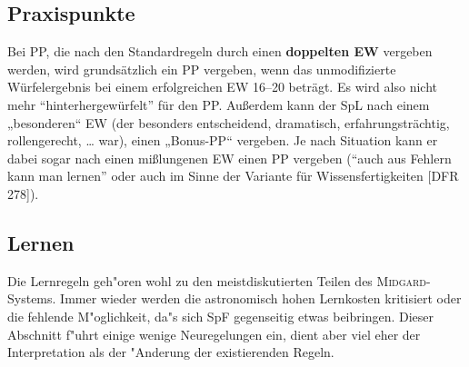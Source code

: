 \documentclass[10pt,a4paper,germanpar]{article}
\begin{document}
\subsection{Praxispunkte}

Bei PP, die nach den Standardregeln durch einen \textbf{doppelten EW}
vergeben werden, wird grundsätzlich ein PP vergeben, wenn das
unmodifizierte Würfelergebnis bei einem erfolgreichen EW 16--20
beträgt. Es wird also nicht mehr "`hinterhergewürfelt"' für den
PP. Außerdem kann der SpL nach einem „besonderen“ EW (der besonders
entscheidend, dramatisch, erfahrungsträchtig, rollengerecht, \dots
war), einen „Bonus-PP“ vergeben. Je nach Situation kann er dabei sogar
nach einen mißlungenen EW einen PP vergeben ("`auch aus Fehlern kann
man lernen"' oder auch im Sinne der Variante für Wissensfertigkeiten
[DFR\,278]).

% 

\subsection{Lernen}

Die Lernregeln geh"oren wohl zu den meistdiskutierten Teilen des
\textsc{Midgard}-Systems. Immer wieder werden die astronomisch hohen
Lernkosten kritisiert oder die fehlende M"oglichkeit, da"s sich SpF
gegenseitig etwas beibringen. Dieser Abschnitt f"uhrt einige wenige
Neuregelungen ein, dient aber viel eher der Interpretation als der
"Anderung der existierenden Regeln.
\end{document}
